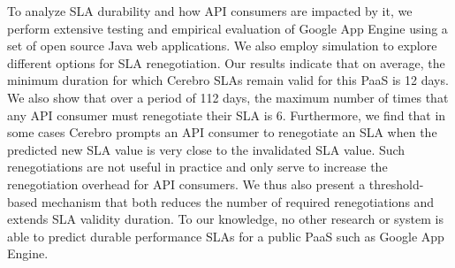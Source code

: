
To analyze SLA durability and how API consumers are 
impacted by it, we perform extensive testing and empirical evaluation
of Google App Engine using a set of open source Java web applications.  
We also employ simulation to explore different options for SLA renegotiation.
Our results indicate that on average, the minimum duration for which Cerebro SLAs 
remain valid for this PaaS is 12 days. We also show that
over a period of 112 days, the maximum number of times that any API consumer must renegotiate
their SLA is 6.  Furthermore, we find that in some cases Cerebro prompts an API consumer to
renegotiate an SLA when the predicted new SLA value is very close to the invalidated SLA value. 
Such renegotiations are not useful in practice and only serve to increase the renegotiation overhead
for API consumers. We thus also present a threshold-based mechanism that both reduces 
the number of required renegotiations and extends SLA validity duration.
To our knowledge, no other research or system is able to predict
durable performance SLAs for a public PaaS such as Google App Engine.